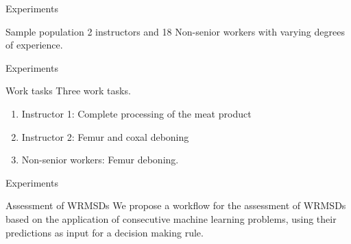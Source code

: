 
\begin{frame}{Experiments}
\begin{alertblock}{Sample population}
    2 instructors and 18 Non-senior workers with varying degrees of experience.
\end{alertblock}    
\end{frame}



\begin{frame}{Experiments}
    \begin{alertblock}{Work tasks}
      Three work tasks. 
      \begin{enumerate}
          \item Instructor 1: Complete processing of the meat product
          \item Instructor 2: Femur and coxal deboning
          \item Non-senior workers: Femur deboning.
      \end{enumerate}
    \end{alertblock}
\end{frame}

\begin{frame}{Experiments}
    \begin{alertblock}{Assessment of WRMSDs}
        We propose a workflow for the assessment of WRMSDs based on the application of consecutive machine learning problems, using their predictions as input for a decision making rule.
    \end{alertblock}
\end{frame}